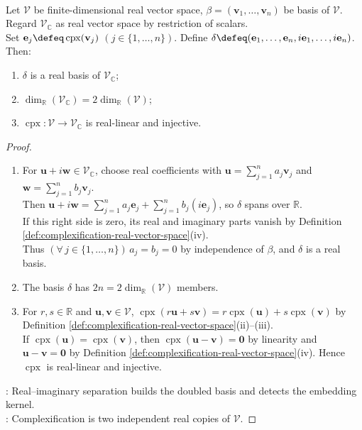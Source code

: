 \begin{proposition} \label{prop:complexification-real-dimension-and-embedding} \\
Let $\mathcal{V}$ be finite-dimensional real vector space, $\beta=(\mathbf{v}_1,\ldots,\mathbf{v}_n)$ be basis of $\mathcal{V}$. Regard $\mathcal{V}_{\mathbb{C}}$ as real vector space by restriction of scalars.\\
Set $\mathbf{e}_j\defeq\operatorname{cpx}(\mathbf{v}_j)$ $(j\in\{1,\ldots,n\})$. Define $\delta\defeq(\mathbf{e}_1,\ldots,\mathbf{e}_n,i\mathbf{e}_1,\ldots,i\mathbf{e}_n)$. Then:
\begin{enumerate}[label=(\roman*)]
\setlength{\itemsep}{0pt}
\item $\delta$ is a real basis of $\mathcal{V}_{\mathbb{C}}$;
\item $\dim_{\mathbb{R}}(\mathcal{V}_{\mathbb{C}})=2\dim_{\mathbb{R}}(\mathcal{V})$;
\item $\operatorname{cpx}:\mathcal{V}\to\mathcal{V}_{\mathbb{C}}$ is real-linear and injective.
\end{enumerate}
\begin{proof}
\begin{enumerate}[label=(\roman*)]
\setlength{\itemsep}{0pt}
\item For $\mathbf{u}+i\mathbf{w}\in\mathcal{V}_{\mathbb{C}}$, choose real coefficients with $\mathbf{u}=\sum\limits_{j=1}^{n}a_j\mathbf{v}_j$ and $\mathbf{w}=\sum\limits_{j=1}^{n}b_j\mathbf{v}_j$.\\
Then $\mathbf{u}+i\mathbf{w}=\sum\limits_{j=1}^{n}a_j\mathbf{e}_j+\sum\limits_{j=1}^{n}b_j(i\mathbf{e}_j)$, so $\delta$ spans over $\mathbb{R}$.\\
If this right side is zero, its real and imaginary parts vanish by Definition \ref{def:complexification-real-vector-space}(iv).\\
Thus $(\forall\,j\in\{1,\ldots,n\})\,a_j=b_j=0$ by independence of $\beta$, and $\delta$ is a real basis.
\item The basis $\delta$ has $2n=2\dim_{\mathbb{R}}(\mathcal{V})$ members.
\item For $r,s\in\mathbb{R}$ and $\mathbf{u},\mathbf{v}\in\mathcal{V}$, $\operatorname{cpx}(r\mathbf{u}+s\mathbf{v})=r\operatorname{cpx}(\mathbf{u})+s\operatorname{cpx}(\mathbf{v})$ by Definition \ref{def:complexification-real-vector-space}(ii)--(iii).\\
If $\operatorname{cpx}(\mathbf{u})=\operatorname{cpx}(\mathbf{v})$, then $\operatorname{cpx}(\mathbf{u}-\mathbf{v})=\mathbf{0}$ by linearity and $\mathbf{u}-\mathbf{v}=\mathbf{0}$ by Definition \ref{def:complexification-real-vector-space}(iv). Hence $\operatorname{cpx}$ is real-linear and injective.
\end{enumerate}
: Real--imaginary separation builds the doubled basis and detects the embedding kernel.\\
: Complexification is two independent real copies of $\mathcal{V}$.
\end{proof}
\end{proposition}

